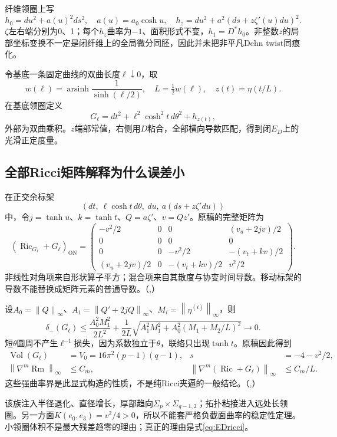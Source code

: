 \documentclass[UTF8,fontset=fandol,zihao=-4]{ctexart}
\theoremstyle{research}
\DeclareMathOperator{\Ric}{Ric}
\DeclareMathOperator{\Rm}{Rm}
\DeclareMathOperator{\Vol}{Vol}
\newcommand{\norm}[1]{\left\|#1\right\|}
\numberwithin{equation}{section}
\begin{document}
纤维领圈上写
\[
h_0=du^2+a(u)^2ds^2,\quad a(u)=a_0\cosh u,
\quad h_z=du^2+a^2(ds+z\zeta'(u)du)^2.
\]
$\zeta$左右端分别为0、1；每个$h_z$曲率为$-1$、面积形式不变，$h_1=D^*h_0$。非整数$z$的局部坐标变换不一定是闭纤维上的全局微分同胚，因此并未把非平凡Dehn twist同痕化。

令基底一条固定曲线的双曲长度$\ell\downarrow0$，取
\[
w(\ell)=\operatorname{arsinh}\frac1{\sinh(\ell/2)},\quad
L=\tfrac12w(\ell),\quad z(t)=\eta(t/L).
\]
在基底领圈定义
\[
G_\ell=dt^2+\ell^2\cosh^2t\,d\theta^2+h_{z(t)},
\]
外部为双曲乘积。$z$端部常值，右侧用$D$粘合，全部横向导数匹配，得到闭$E_D$上的光滑正定度量。

\subsection{全部Ricci矩阵解释为什么误差小}
在正交余标架
\[
(dt,\ \ell\cosh t\,d\theta,\ du,\ a(ds+z\zeta'du))
\]
中，令$j=\tanh u$、$k=\tanh t$、$Q=a\zeta'$、$v=Qz'$。原稿的完整矩阵为
\begin{equation}\label{eq:EDricci}
(\Ric_{G_\ell}+G_\ell)_{\mathrm{ON}}=
\begin{pmatrix}
-v^2/2&0&0&(v_u+2jv)/2\\
0&0&0&0\\
0&0&-v^2/2&-(v_t+kv)/2\\
(v_u+2jv)/2&0&-(v_t+kv)/2&v^2/2
\end{pmatrix}.
\end{equation}
非线性对角项来自形状算子平方；混合项来自其散度与协变时间导数。移动标架的导数不能替换成矩阵元素的普通导数。\cite{L}（,）

设$A_0=\norm Q_\infty$、$A_1=\norm{Q'+2jQ}_\infty$、$M_i=\norm{\eta^{(i)}}_\infty$，则
\[
\delta_-(G_\ell)\le\frac{A_0^2M_1^2}{2L^2}
+\frac1{2L}\sqrt{A_1^2M_1^2+A_0^2(M_1+M_2/L)^2}\longrightarrow0.
\]
短$\theta$圆周不产生$\ell^{-1}$损失，因为系数独立于$\theta$，联络只出现$\tanh t$。原稿因此得到
\begin{align}
\Vol(G_\ell)&=V_0=16\pi^2(p-1)(q-1),&s&=-4-v^2/2,\\
\norm{\nabla^m\Rm}_{\infty}&\le C_m,&
\norm{\nabla^m(\Ric+G_\ell)}_\infty&\le C_m/L.
\end{align}
这些强曲率界是此显式构造的性质，不是纯Ricci夹逼的一般结论。\cite{L}（,）

该族注入半径退化、直径增长，厚部趋向$\Sigma_p\times\Sigma_{q-1,2}$；拓扑粘接进入远处长领圈。另一方面$K(e_0,e_3)=v^2/4>0$，所以不能套严格负截面曲率的稳定性定理。小领圈体积不是最大残差趋零的理由；真正的理由是式\eqref{eq:EDricci}。
\end{document}
